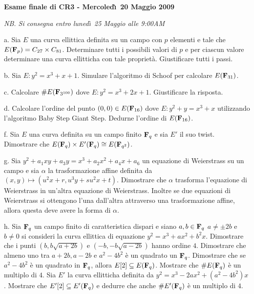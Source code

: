 \nopagenumbers
\def\F{{\bf F}}
\def\N{{\bf N}}
\vskip 2cm
\centerline{\bf Esame finale di CR3 - Mercoled\`\i\ 20 Maggio 2009}
\centerline{\it NB. Si consegna entro luned\`\i\ 25 Maggio alle 9:00AM}\bigskip\bigskip
 
\item{a.} Sia $E$ una curva ellittica definita su un campo con $p$ elementi e tale che
$E(\F_p)=C_{27}\times C_{81}$. Determinare tutti i possibili valori di $p$ e per ciascun valore
determinare una curva ellitticha con tale propriet\`a. Giustificare tutti i passi.\bigskip

\item{b.} Sia $E: y^2=x^3+x+1$. Simulare l'algoritmo di Schoof per calcolare $E(\F_{31})$. \bigskip

\item{c.} Calcolare $\#E(\F_{3^{100}})$ dove $E: y^2=x^3+2x+1$. Giustificare la risposta.\bigskip

\item{d.} Calcolare l'ordine del punto $(0,0)\in E(\F_{16})$ dove $E: y^2+y=x^3+x$ utilizzando
l'algoritmo Baby Step Giant Step. Dedurne l'ordine di $E(\F_{16})$.\bigskip

\item{f.} Sia $E$ una curva definita su un campo finito $\F_q$ e sia $E'$ il suo twist. 
Dimostrare che $E(\F_q)\times E'(\F_q) \cong E(\F_{q^2})$.\bigskip

\item{g.} Sia $y^2+a_1xy+a_3y=x^3+a_2x^2+a_4x+a_6$ un equazione di Weierstrass su un campo e sia 
$\alpha$ la trasformazione affine definita da $(x,y)\mapsto(u^2x+r,u^3y+su^2x+t)$. Dimostrare che $\alpha$
trasforma l'equazione di Weierstrass in un'altra equazione di Weierstrass. Inoltre se due equazioni di
Weierstrass si ottengono l'una dall'altra attraverso una trasformazione affine, allora questa deve avere la
forma di $\alpha$.\bigskip

\item{h.} Sia $\F_q$ un campo finito di caratteristica dispari e siano $a, b\in\F_q$ 
$a \neq \pm2b$ e $b\neq 0$ si consideri la curva ellittica di equazione $y^2 = x^3 + ax^2 + b^2 x$.\medskip 
{} Dimostrare che i punti $(b,b\sqrt{a+2b})$ e $(-b,-b\sqrt{a-2b})$ hanno ordine $4$.\smallskip
{} Dimostrare che almeno uno tra $a+2b, a-2b$ e $a^2-4b^2$ \`e un quadrato un $\F_q$.\smallskip 
{} Dimostrare che se $a^2-4b^2$ \`e un quadrato in $\F_q$, allora $E[2]\subseteq E(\F_q)$.\smallskip
{} Mostrare che $\#E(\F_q)$ \`e un multiplo di $4$.\smallskip
{} Sia $E'$ la curva ellitticha definita da $y^2 = x^3-2ax^2+(a^2-4b^2)x$.\smallskip
Mostrare che $E'[2]\subseteq E'(\F_q)$ e dedurre che anche $\#E'(\F_q)$ \`e un multiplo di $4$.\bigskip

